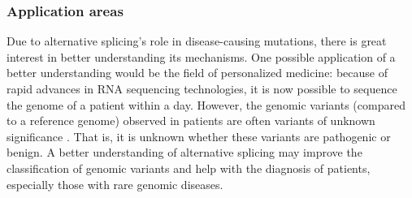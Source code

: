 \subsubsection{Application areas}
Due to alternative splicing's role in disease-causing mutations, there is great interest in better understanding its mechanisms. One possible application of a better understanding would be the field of personalized medicine: because of rapid advances in RNA sequencing technologies, it is now possible to sequence the genome of a patient within a day. However, the genomic variants (compared to a reference genome) observed in patients are often variants of unknown significance \cite{bretschneiderphdthesis}. That is, it is unknown whether these variants are pathogenic or benign. A better understanding of alternative splicing may improve the classification of genomic variants and help with the diagnosis of patients, especially those with rare genomic diseases.
